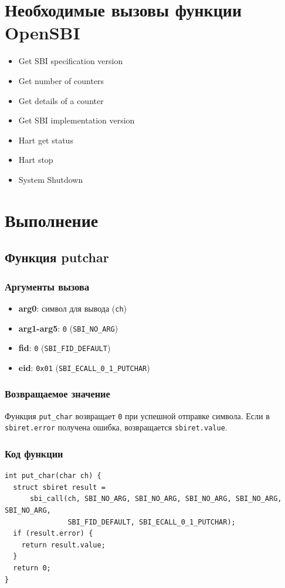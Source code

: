 \documentclass[12pt,a4paper]{report}
\begin{document}
\section*{Необходимые вызовы функции OpenSBI}
\begin{itemize}
    \item Get SBI specification version
    \item Get number of counters
    \item Get details of a counter
    \item Get SBI implementation version
    \item Hart get status
    \item Hart stop
    \item System Shutdown
\end{itemize}
\pagebreak
\section*{Выполнение}
\subsection*{Функция putchar}
\subsubsection*{Аргументы вызова}
\begin{itemize}
    \item \textbf{arg0}: символ для вывода (\texttt{ch})
    \item \textbf{arg1-arg5}: \texttt{0} (\texttt{SBI\_NO\_ARG})
    \item \textbf{fid}: \texttt{0} (\texttt{SBI\_FID\_DEFAULT})
    \item \textbf{eid}: \texttt{0x01} (\texttt{SBI\_ECALL\_0\_1\_PUTCHAR})
\end{itemize}
\subsubsection*{Возвращаемое значение}
Функция \texttt{put\_char} возвращает \texttt{0} при успешной отправке символа.
Если в \texttt{sbiret.error} получена ошибка, возвращается \texttt{sbiret.value}.
\subsubsection*{Код функции}
\begin{verbatim}
int put_char(char ch) {
  struct sbiret result =
      sbi_call(ch, SBI_NO_ARG, SBI_NO_ARG, SBI_NO_ARG, SBI_NO_ARG, SBI_NO_ARG,
               SBI_FID_DEFAULT, SBI_ECALL_0_1_PUTCHAR);
  if (result.error) {
    return result.value;
  }
  return 0;
}
\end{verbatim}
\end{document}
